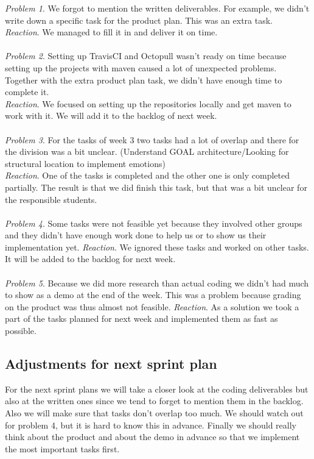 \documentclass{scrartcl}
\begin{document}
\emph{Problem 1}. We forgot to mention the written deliverables. For example, we didn't write down a specific task for the product plan. This was an extra task.\\
\emph{Reaction}. We managed to fill it in and deliver it on time.\\
\\
\emph{Problem 2}. Setting up TravisCI and Octopull wasn't ready on time because setting up the projects with maven caused a lot of unexpected problems. Together with the extra product plan task, we didn't have enough time to complete it.\\
\emph{Reaction}. We focused on setting up the repositories locally and get maven to work with it. We will add it to the backlog of next week.\\
\\
\emph{Problem 3}. For the tasks of week 3 two tasks had a lot of overlap and there for the division was a bit unclear. (Understand GOAL architecture/Looking for structural location to implement emotions)\\
\emph{Reaction}. One of the tasks is completed and the other one is only completed partially. The result is that we did finish this task, but that was a bit unclear for the responsible students.\\
\\
\emph{Problem 4}. Some tasks were not feasible yet because they involved other groups and they didn't have enough work done to help us or to show us their implementation yet.
\emph{Reaction}. We ignored these tasks and worked on other tasks. It will be added to the backlog for next week.\\
\\
\emph{Problem 5}. Because we did more research than actual coding we didn't had much to show as a demo at the end of the week. This was a problem because grading on the product was thus almost not feasible.
\emph{Reaction}. As a solution we took a part of the tasks planned for next week and implemented them as fast as possible.

\subsection{Adjustments for next sprint plan}
For the next sprint plans we will take a closer look at the coding deliverables but also at the written ones since we tend to forget to mention them in the backlog.
Also we will make sure that tasks don't overlap too much.
We should watch out for problem 4, but it is hard to know this in advance.
Finally we should really think about the product and about the demo in advance so that we implement the most important tasks first.
\end{document}
